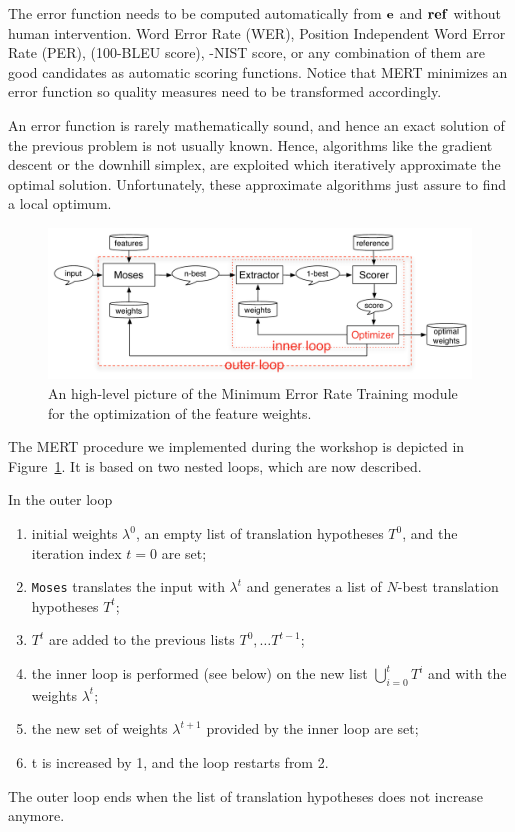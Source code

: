 \documentclass[11pt]{report}
\theoremstyle{plain}
\begin{document}
{The error function needs to be computed automatically from ${\bf e}$ and ${\bf ref}$ without human intervention. Word Error Rate (WER), Position Independent Word Error Rate (PER), (100-BLEU score), -NIST score, or any combination of them are good candidates as automatic scoring functions. Notice that MERT minimizes an error function so quality measures need to be transformed accordingly.

An error function is rarely mathematically sound, and hence an exact solution of the previous problem is not usually known. Hence, algorithms like the gradient descent or the downhill simplex, are exploited which iteratively approximate the optimal solution. Unfortunately, these approximate algorithms just assure to find a local optimum.

\begin{figure}
\begin{center}
 \includegraphics[width=\columnwidth]{MER-ext}
\caption{An high-level picture of the Minimum Error Rate Training module for the optimization of the feature weights.}
\label{fig:MERT}
\end{center}
 \end{figure}
 
The MERT procedure we implemented during the workshop is depicted in Figure~\ref{fig:MERT}. 
It is based on two nested loops, which are now described.

In the outer loop 
\begin{enumerate}
\item initial weights $\lambda^0$, an empty list of translation hypotheses $T^0$, and the iteration index $t=0$ are set;
\item {\tt Moses} translates the input with  $\lambda^t$ and generates a list of $N$-best translation hypotheses $T^t$;
\item $T^t$ are added to the previous lists $T^0, \ldots T^{t-1}$;
\item the inner loop is performed (see below) on the new list $\bigcup_{i=0}^{t}T^i$ and with the weights $\lambda^t$;
\item the  new set of weights $\lambda^{t+1}$ provided by the inner loop are set;
\item t is increased by 1, and the loop restarts from 2.
\end{enumerate}
The outer loop ends when the list of translation hypotheses does not increase anymore.

}
\end{document}
